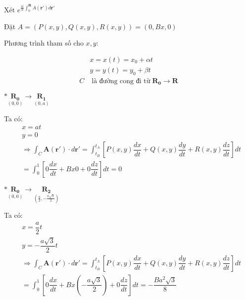 \documentclass{report}
\begin{document}
\noindent Xét $e^{\frac{ie}{\hbar}\int_{0}^{\mathbf{R}}A(\mathbf{r'})d\mathbf{r'}}$

\noindent Đặt $A = \left(P(x,y),Q(x,y),R(x,y)\right) = (0,Bx,0)$

\noindent Phương trình tham số cho $x,y$:

\begin{align*}
	  & x = x(t) = x_0 + \alpha t                                            \\
	  & y = y(t) = y_0 + \beta t                                             \\
	C & \; \text{là đường cong đi từ} \; \mathbf{R_0} \rightarrow \mathbf{R}
\end{align*}

\clearpage

\noindent $\ast \underset{(0,0)}{\mathbf{R_0}}  \longrightarrow \underset{(0,a)}{\mathbf{R_1}}$

Ta có:
\begin{align*}
	 & x = at                                                                                                                                                                  \\
	 & y = 0                                                                                                                                                                   \\
	 & \Rightarrow \int_{C} \mathbf{A}(\mathbf{r'})\cdot d\mathbf{r'} =  \int_{t_B}^{t_A} \left[ P(x,y)\dfrac{dx}{dt} + Q(x,y)\dfrac{dy}{dt} + R(x,y)\dfrac{dz}{dt} \right] dt \\
	 & = \int_{0}^{1} \left[ 0\dfrac{dx}{dt} + Bx0 + 0\dfrac{dz}{dt} \right] dt = 0
\end{align*}

\noindent $\ast \underset{(0,0)}{\mathbf{R_0}}  \longrightarrow \underset{(\frac{a}{2},-\frac{a\sqrt{3}}{2})}{\mathbf{R_2}}$

Ta có:
\begin{align*}
	 & x = \dfrac{a}{2}t                                                                                                                                                       \\
	 & y = -\dfrac{a\sqrt{3}}{2}t                                                                                                                                              \\
	 & \Rightarrow \int_{C} \mathbf{A}(\mathbf{r'})\cdot d\mathbf{r'} =  \int_{t_B}^{t_A} \left[ P(x,y)\dfrac{dx}{dt} + Q(x,y)\dfrac{dy}{dt} + R(x,y)\dfrac{dz}{dt} \right] dt \\
	 & = \int_{0}^{1} \left[ 0\dfrac{dx}{dt} + Bx\left(-\dfrac{a\sqrt{3}}{2}\right) + 0\dfrac{dz}{dt} \right] dt = -\dfrac{Ba^2\sqrt{3}}{8}
\end{align*}
\end{document}
